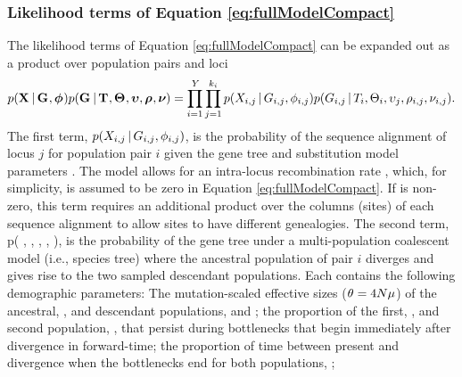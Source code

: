 \subsubsection{Likelihood terms of Equation \ref{eq:fullModelCompact}}
\begin{linenomath}
The likelihood terms of Equation \ref{eq:fullModelCompact} can
be expanded out as a product over population pairs and loci
\begin{equation}
    p(\alignmentVector \given \geneTreeVector, \hkyModelVector)
    p(\geneTreeVector \given \divTimeMapVector, \demographicParamVector,
    \locusMutationRateScalarVector, \ploidyScalarVector,
    \mutationRateScalarConstantVector) = 
    \prod_{i=1}^{\npairs{}}
    \prod_{j=1}^{\nloci{i}}
    p(\alignment{i}{j} \given \geneTree{i}{j}, \hkyModel{i}{j})
    p(\geneTree{i}{j} \given \divTimeMap{i}, \demographicParams{i},
    \locusMutationRateScalar{j}, \ploidyScalar{i}{j},
    \mutationRateScalarConstant{i}{j}).
    \label{eq:modelLikelihoodExpanded}
\end{equation}
The first term,
$p(\alignment{i}{j} \given \geneTree{i}{j}, \hkyModel{i}{j})$,
is the probability of the sequence alignment of locus $j$ for population pair
$i$ given the gene tree and \hky substitution model parameters \citep[i.e., the
``Felsenstein likelihood'';][]{Felsenstein1981}.
The model allows for an intra-locus recombination rate \recombinationRate,
which, for simplicity, is assumed to be zero in Equation
\ref{eq:fullModelCompact}.
If \recombinationRate is non-zero, this term requires an additional product
over the columns (sites) of each sequence alignment to allow sites to have
different genealogies.
The second term,
p( \given {}, ,
, ,
),
is the probability of the gene tree under a multi-population coalescent model
(i.e., species tree) where the ancestral population of pair $i$ diverges
and gives rise to the two sampled descendant populations.
Each \demographicParams{} contains the following demographic parameters: The
mutation-scaled effective sizes ($\theta_{} = 4N\mu$) of the
ancestral, \ancestralTheta{}, and descendant populations, 
and ;
the proportion of the first, , and second population,
, that persist during bottlenecks that begin immediately
after divergence in forward-time;
the proportion of time between present and divergence when the bottlenecks
end for both populations, \bottleTime{};

\end{linenomath}
